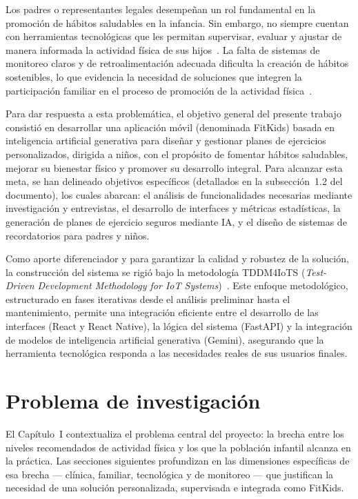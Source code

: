 		Los padres o representantes legales desempeñan un rol fundamental en la promoción de hábitos saludables en la infancia. Sin embargo, no siempre cuentan con herramientas tecnológicas que les permitan supervisar, evaluar y ajustar de manera informada la actividad física de sus hijos~\cite{VegaDiaz2023}. La falta de sistemas de monitoreo claros y de retroalimentación adecuada dificulta la creación de hábitos sostenibles, lo que evidencia la necesidad de soluciones que integren la participación familiar en el proceso de promoción de la actividad física~\cite{Direito2017}.
		
		Para dar respuesta a esta problemática, el objetivo general del presente trabajo consistió en desarrollar una aplicación móvil (denominada FitKids) basada en inteligencia artificial generativa para diseñar y gestionar planes de ejercicios personalizados, dirigida a niños, con el propósito de fomentar hábitos saludables, mejorar su bienestar físico y promover su desarrollo integral. Para alcanzar esta meta, se han delineado objetivos específicos (detallados en la subsección~1.2 del documento), los cuales abarcan: el análisis de funcionalidades necesarias mediante investigación y entrevistas, el desarrollo de interfaces y métricas estadísticas, la generación de planes de ejercicio seguros mediante IA, y el diseño de sistemas de recordatorios para padres y niños.
	
		Como aporte diferenciador y para garantizar la calidad y robustez de la solución, la construcción del sistema se rigió bajo la metodología TDDM4IoTS (\textit{Test-Driven Development Methodology for IoT Systems})~\cite{GuerreroUlloa2024}. Este enfoque metodológico, estructurado en fases iterativas desde el análisis preliminar hasta el mantenimiento, permite una integración eficiente entre el desarrollo de las interfaces (React y React Native), la lógica del sistema (FastAPI) y la integración de modelos de inteligencia artificial generativa (Gemini), asegurando que la herramienta tecnológica responda a las necesidades reales de sus usuarios finales.
	
	\label{marcontextual}
		\section{Problema de investigación}
			El Capítulo~I contextualiza el problema central del proyecto: la brecha entre los niveles recomendados de actividad física y los que la población infantil alcanza en la práctica. Las secciones siguientes profundizan en las dimensiones específicas de esa brecha --- clínica, familiar, tecnológica y de monitoreo --- que justifican la necesidad de una solución personalizada, supervisada e integrada como FitKids.

